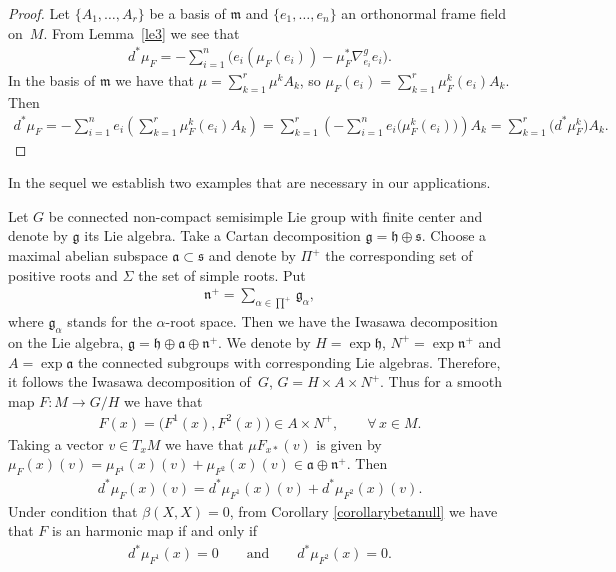 \documentclass[10pt,a4paper]{amsart}
\numberwithin{equation}{section}
\newcommand{\g}{\mathfrak{g}}
\newcommand{\m}{\mathfrak{m}}
\newcommand{\h}{\mathfrak{h}}
\begin{document}
\begin{proof}
  Let $\{A_1, \ldots, A_r\}$ be a basis of $\m$  and $\{e_1, \ldots, e_n\}$ an orthonormal frame f\/ield on~$M$. From Lemma~\ref{le3} we see that
  \begin{gather*}
    d^{*}\mu_{F} = -\sum_{i=1}^{n}\big(e_{i}(\mu_{F}(e_{i})) -
    \mu_{F}^{*}\nabla^{g}_{e_{i}}e_{i}\big).
  \end{gather*}
  In the basis of $\m$ we have that $\mu = \sum\limits_{k=1}^{r}\mu^{k} A_k$, so
  $\mu_{F}(e_{i})= \sum\limits_{k=1}^{r} \mu_{F}^k(e_i) A_{k}$. Then
  \begin{gather*}
    d^{*}\mu_{F}
      =   -\sum_{i=1}^{n}e_{i}\left(\sum_{k=1}^{r}\mu_{F}^k (e_i) A_{k}\right) =
    \sum_{k=1}^{r}\left(-\sum_{i=1}^{n}e_{i}\big(\mu_{F}^k (e_i)\big)\right) A_{k}
      =   \sum_{k=1}^{r}\big(d^*\mu_{F}^k\big) A_{k}.\tag*{\qed}
  \end{gather*}
  \renewcommand{\qed}{}
\end{proof}

In the sequel we establish two examples that are necessary in our applications.

\begin{Example}\label{iwasa-decomp}
  Let $G$ be connected non-compact semisimple Lie group with f\/inite center and denote by $\g$ its Lie algebra. Take a Cartan decomposition $\g = \h  \oplus \mathfrak{s}$. Choose a maximal abelian subspace $\mathfrak{a} \subset \mathfrak{s}$  and denote by ${\Pi}^{+}$ the corresponding set of positive roots and $\Sigma$ the set of simple roots. Put
  \begin{gather*}
    \mathfrak{n}^{+}=\sum_{\alpha \in {\prod}^{+}} {\g}_{\alpha} ,
  \end{gather*}
  where ${\g}_{\alpha}$ stands for the $\alpha$-root space. Then we have the Iwasawa decomposition on the Lie algebra, $\g = \h \oplus \mathfrak{a} \oplus \mathfrak{n}^{+}$. We denote by $H=\exp \mathfrak{h}$, $N^{+}=\exp \mathfrak{n}^{+}$ and $A=\exp \mathfrak{a}$ the connected subgroups with corresponding Lie algebras. Therefore, it follows the Iwasawa decomposition of~$G$, $G=H \times A \times N^{+}$. Thus for a smooth map $F\colon  M \rightarrow G/H$ we have that
  \begin{gather*}
    F(x) = \big(F^1(x),F^2(x)\big) \in  A\times N^{+},\qquad \forall\, x \in M.
  \end{gather*}
  Taking a vector $ v \in T_xM$ we have that $ \mu F_{x*}(v)$ is given by  $\mu_{F}(x)(v)= \mu_{F^1}(x)(v)
   + \mu_{F^2}(x)(v) \in \mathfrak{a} \oplus \mathfrak{n}^{+}$. Then
  \begin{gather*}
    d^*\mu_{F}(x)(v)  = d^*\mu_{F^1}(x)(v) + d^*\mu_{F^2}(x)(v).
  \end{gather*}
  Under condition that $\beta(X,X)=0$, from Corollary \ref{corollarybetanull} we have that $F$ is an harmonic map if and only if
  \begin{gather*}
    d^*\mu_{F^1}(x) = 0\qquad  \textrm{and}\qquad d^*\mu_{F^2}(x)=0.
  \end{gather*}
\end{Example}
\end{document}
